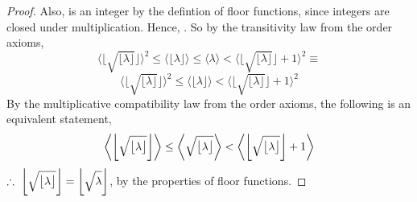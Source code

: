 \documentclass[preview]{standalone}
\begin{document}
\begin{proof}
    Also,
    is an integer by the defintion of floor functions,
    since integers are closed under multiplication. 
    Hence,
    \bm{$
        \big \lfloor \sqrt{ \lfloor \lambda \rfloor } \big \rfloor ^2
            \leq
        \big \lfloor \lambda \big \rfloor
    $}.
    So by the transitivity law from the order axioms,
    \begin{equation*}
        \bigg \langle 
            \bigg \lfloor 
                \sqrt{ 
                    \big \lfloor \lambda \big \rfloor
                }
            \bigg \rfloor
        \bigg \rangle
            ^2
            \leq
        \bigg \langle
            \big \lfloor \lambda \big \rfloor
        \bigg \rangle
            \leq
        \bigg \langle
            \lambda
        \bigg \rangle
            <
        \bigg \langle 
            \bigg \lfloor 
                \sqrt{ 
                    \big \lfloor \lambda \big \rfloor
                }
            \bigg \rfloor
                +
            1
        \bigg \rangle
            ^2
            \equiv
    \end{equation*}
    \begin{equation*}
        \bigg \langle 
            \bigg \lfloor 
                \sqrt{ 
                    \big \lfloor \lambda \big \rfloor
                }
            \bigg \rfloor
        \bigg \rangle
            ^2
            \leq
        \bigg \langle
            \big \lfloor \lambda \big \rfloor
        \bigg \rangle
            <
        \bigg \langle 
            \bigg \lfloor 
                \sqrt{ 
                    \big \lfloor \lambda \big \rfloor
                }
            \bigg \rfloor
                +
            1
        \bigg \rangle
            ^2
    \end{equation*}
    By the multiplicative compatibility law from the order axioms,
    the following is an equivalent statement,
    \begin{equation*}
        \bigg \langle 
            \bigg \lfloor 
                \sqrt{ 
                    \big \lfloor \lambda \big \rfloor
                }
            \bigg \rfloor
        \bigg \rangle
            \leq
        \bigg \langle
            \sqrt{ \strut \big \lfloor \lambda \big \rfloor }
        \bigg \rangle
            <
        \bigg \langle 
            \bigg \lfloor 
                \sqrt{ 
                    \big \lfloor \lambda \big \rfloor
                }
            \bigg \rfloor
                +
            1
        \bigg \rangle
    \end{equation*}
    $\therefore \text{\space} \relax{
        \bigg \lfloor 
            \sqrt{ \strut \big \lfloor \lambda \big \rfloor } 
        \bigg \rfloor 
            = 
        \bigg \lfloor \sqrt{ \strut \lambda} \bigg \rfloor
    }$, by the properties of floor functions.
\color{lightgray} \end{proof}
\end{document}
